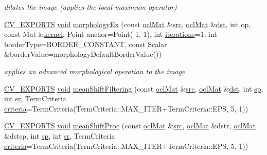 \begin{DoxyCompactItemize}
\begin{DoxyCompactList}\small\item\em dilates the image (applies the local maximum operator) \end{DoxyCompactList}\item 
\hyperlink{core_2types__c_8h_a1bf9f0e121b54272da02379cfccd0a2b}{C\-V\-\_\-\-E\-X\-P\-O\-R\-T\-S} \hyperlink{legacy_8hpp_a8bb47f092d473522721002c86c13b94e}{void} \hyperlink{namespacecv_1_1ocl_ac64e244fb0cfcb6c7ae81ef92b073a45}{morphology\-Ex} (const \hyperlink{classcv_1_1ocl_1_1oclMat}{ocl\-Mat} \&\hyperlink{legacy_8hpp_a371cd109b74033bc4366f584edd3dacc}{src}, \hyperlink{classcv_1_1ocl_1_1oclMat}{ocl\-Mat} \&\hyperlink{photo__c_8h_aed13e2a25279b24dc954073233fef7a5}{dst}, int op, const Mat \&\hyperlink{imgproc__c_8h_a863a75780ba6c5de552f5361cb0d2c89}{kernel}, Point anchor=Point(-\/1,-\/1), int \hyperlink{tracking_8hpp_a17372ac3c8ba01bc6cfc265b2824992e}{iterations}=1, int border\-Type=B\-O\-R\-D\-E\-R\-\_\-\-C\-O\-N\-S\-T\-A\-N\-T, const Scalar \&border\-Value=morphology\-Default\-Border\-Value())
\begin{DoxyCompactList}\small\item\em applies an advanced morphological operation to the image \end{DoxyCompactList}\item 
\hyperlink{core_2types__c_8h_a1bf9f0e121b54272da02379cfccd0a2b}{C\-V\-\_\-\-E\-X\-P\-O\-R\-T\-S} \hyperlink{legacy_8hpp_a8bb47f092d473522721002c86c13b94e}{void} \hyperlink{namespacecv_1_1ocl_a3691c016a2527556643b93d1412476e5}{mean\-Shift\-Filtering} (const \hyperlink{classcv_1_1ocl_1_1oclMat}{ocl\-Mat} \&\hyperlink{legacy_8hpp_a371cd109b74033bc4366f584edd3dacc}{src}, \hyperlink{classcv_1_1ocl_1_1oclMat}{ocl\-Mat} \&\hyperlink{photo__c_8h_aed13e2a25279b24dc954073233fef7a5}{dst}, int \hyperlink{imgproc__c_8h_ac14bc2e984efdff6b1fa7e106f3ac14a}{sp}, int \hyperlink{imgproc__c_8h_acecaf9a0f96f944ff768b10358b45839}{sr}, Term\-Criteria \hyperlink{tracking_8hpp_ac10fcea99ab081e745366c6f5bbc8eb5}{criteria}=Term\-Criteria(Term\-Criteria\-::\-M\-A\-X\-\_\-\-I\-T\-E\-R+Term\-Criteria\-::\-E\-P\-S, 5, 1))
\item 
\hyperlink{core_2types__c_8h_a1bf9f0e121b54272da02379cfccd0a2b}{C\-V\-\_\-\-E\-X\-P\-O\-R\-T\-S} \hyperlink{legacy_8hpp_a8bb47f092d473522721002c86c13b94e}{void} \hyperlink{namespacecv_1_1ocl_a79f96731f6eb0f4e99d450ed96919d9e}{mean\-Shift\-Proc} (const \hyperlink{classcv_1_1ocl_1_1oclMat}{ocl\-Mat} \&\hyperlink{legacy_8hpp_a371cd109b74033bc4366f584edd3dacc}{src}, \hyperlink{classcv_1_1ocl_1_1oclMat}{ocl\-Mat} \&dstr, \hyperlink{classcv_1_1ocl_1_1oclMat}{ocl\-Mat} \&dstsp, int \hyperlink{imgproc__c_8h_ac14bc2e984efdff6b1fa7e106f3ac14a}{sp}, int \hyperlink{imgproc__c_8h_acecaf9a0f96f944ff768b10358b45839}{sr}, Term\-Criteria \hyperlink{tracking_8hpp_ac10fcea99ab081e745366c6f5bbc8eb5}{criteria}=Term\-Criteria(Term\-Criteria\-::\-M\-A\-X\-\_\-\-I\-T\-E\-R+Term\-Criteria\-::\-E\-P\-S, 5, 1))

\end{DoxyCompactItemize}
